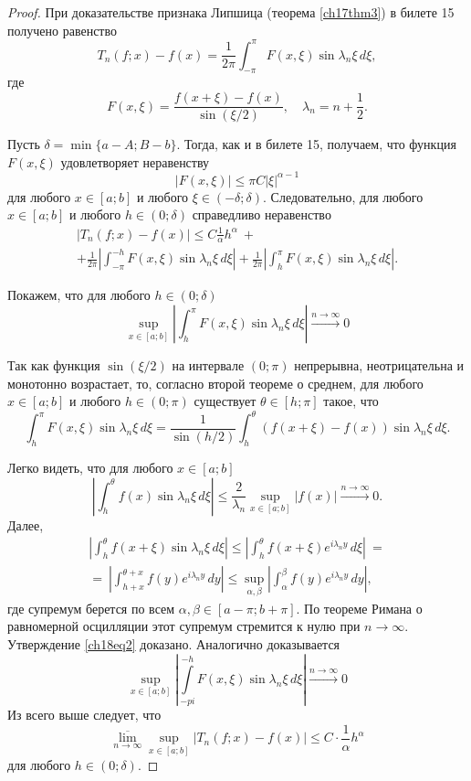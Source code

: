 \begin{proof}
При доказательстве признака Липшица (теорема \ref{ch17thm3}) в билете 15 получено равенство
$$
T_n(f; x) - f(x) = \frac{1}{2\pi} \int_{-\pi}^{\pi} F(x,\xi) \sin{\lambda_n \xi} \,d\xi,
$$
где
$$
F(x,\xi) = \frac{f(x+\xi) - f(x)}{\sin (\xi / 2)}, \quad \lambda_{n} = n + \frac12.
$$

Пусть $\delta = \min \{a - A;B - b\}$. Тогда, как и в билете 15, получаем, что функция $F(x,\xi)$ удовлетворяет неравенству
$$
|F(x,\xi)| \le \pi C |\xi|^{\alpha - 1}
$$
для любого $x \in [a;b]$ и любого $\xi \in (-\delta;\delta)$. Следовательно, для любого $x \in [a;b]$ и любого $h \in (0;\delta)$ справедливо неравенство
\begin{multline} \label{ch18eq1}
|T_n(f; x) - f(x)| \le C \frac{1}{\alpha} h^{\alpha}\ +\\
+ \frac{1}{2\pi} \left| \int_{-\pi}^{-h} F(x,\xi) \sin{\lambda_n \xi} \,d\xi \right| + \frac{1}{2\pi} \left| \int_{h}^{\pi} F(x,\xi) \sin{\lambda_n \xi} \,d\xi \right|.
\end{multline}

Покажем, что для любого $h \in (0;\delta)$
\begin{equation} \label{ch18eq2}
\sup\limits_{x \in [a;b]}\left|\int_{h}^{\pi} F(x,\xi) \sin{\lambda_n \xi} \,d\xi \right| \xrightarrow{n \to \infty} 0
\end{equation}

Так как функция $\sin (\xi / 2)$ на интервале $(0;\pi)$ непрерывна, неотрицательна и монотонно возрастает, то, согласно второй теореме о среднем, для любого $x \in [a;b]$ и любого $h \in (0;\pi)$ существует $\theta \in [h;\pi]$ такое, что
$$
\int_{h}^{\pi} F(x,\xi) \sin{\lambda_n \xi}\,d\xi = \frac{1}{\sin (h / 2)} \int_{h}^{\theta} (f(x+\xi) - f(x)) \sin{\lambda_n \xi}\,d\xi.
$$

Легко видеть, что для любого $x \in [a;b]$
$$
\left| \int_{h}^{\theta} f(x) \sin{\lambda_n \xi}\,d\xi \right| \le \frac{2}{\lambda_{n}}\sup\limits_{x \in [a;b]}|f(x)| \xrightarrow{n \to \infty} 0.
$$
Далее,
\begin{multline*}
\left| \int_{h}^{\theta} f(x + \xi) \sin{\lambda_n \xi}\,d\xi \right| \le \left| \int_{h}^{\theta} f(x + \xi) e^{i\lambda_{n}y} \,d\xi \right|\ =\\
=\ \left| \int_{h + x}^{\theta + x} f(y) e^{i\lambda_{n}y}\,dy \right| \le \sup\limits_{\alpha,\beta} \left|\int_{\alpha}^{\beta} f(y) e^{i\lambda_{n}y}\,dy \right|,
\end{multline*}
где супремум берется по всем $\alpha,\beta \in [a - \pi;b + \pi]$. По теореме Римана о равномерной осцилляции этот супремум стремится к нулю при $n \to \infty$. Утверждение \eqref{ch18eq2} доказано. Аналогично доказывается
\begin{equation} \label{ch18eq3}
\sup\limits_{x \in [a;b]} \left|\int\limits_{-pi}^{-h} F(x,\xi) \sin{\lambda_n \xi} \,d\xi \right| \xrightarrow{n \to \infty} 0
\end{equation}
Из всего выше следует, что
$$
\overline{\lim\limits_{n \to \infty}} \sup \limits_{x \in [a;b]} |T_n(f; x) - f(x)| \le C \cdot \frac{1}{\alpha}h^{\alpha}
$$
для любого $h \in (0;\delta)$.
\end{proof}

